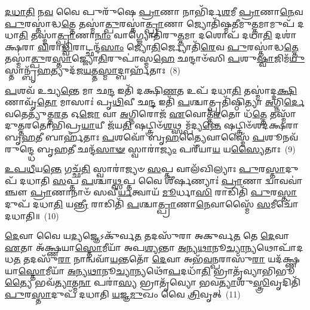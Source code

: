 \-\ul{𑌦}\-\-\ul{𑌧𑌾}\-\-\ul{𑌤𑌿} 𑌨\-\ul{𑌵} 𑌵𑍈 𑌪𑍁𑌰𑍁᳴𑌷𑍇 \ul{𑌪𑍍𑌰𑌾}\-𑌣𑌾 𑌨𑌾𑌭𑌿᳴𑌰𑍍𑌦\-\ul{𑌶}\-𑌮𑍀 \ul{𑌪𑍍𑌰𑌾}\-𑌣𑌾\-\ul{𑌨𑍇}\-𑌵 \ul{𑌪𑍁}\-𑌰𑌸𑍍𑌤𑌾॑𑌦𑍍𑌧\-\ul{𑌤𑍍𑌤𑍇} 𑌤𑌸𑍍𑌮𑌾॑\-\ul{𑌤𑍍𑌪𑍁}\-𑌰𑌸𑍍𑌤𑌾॑\-\ul{𑌤𑍍𑌪𑍍𑌰𑌾}\-𑌣𑌾 𑌜𑍍𑌯𑍋𑌤𑌿᳴𑌷𑍍𑌮𑌤𑍀𑌮𑍁\-\ul{𑌤𑍍𑌤}\-𑌮𑌾𑌮𑍁𑌪᳴ 𑌦𑌧𑌾\-\ul{𑌤𑌿} 𑌤𑌸𑍍𑌮𑌾॑\-\ul{𑌤𑍍𑌪𑍍𑌰𑌾}\-𑌣𑌾\-\ul{𑌨𑌾𑌂} 𑌵𑌾𑌗𑍍𑌜𑍍𑌯𑍋𑌤𑌿᳴𑌰𑍁\-\ul{𑌤𑍍𑌤}\-𑌮𑌾 𑌦𑌶𑍋𑌪᳴ 𑌦𑌧𑌾\-\ul{𑌤𑌿} 𑌦𑌶𑌾॑𑌕𑍍𑌷𑌰𑌾 \ul{𑌵𑌿}\-𑌰𑌾\-\ul{𑌡𑍍𑌵𑌿}\-𑌰𑌾𑌟𑍍𑌛𑌨𑍍𑌦᳴\-\ul{𑌸𑌾𑌂} 𑌜𑍍𑌯𑍋\-\ul{𑌤𑌿}\-𑌰𑍍𑌜𑍍𑌯𑍋𑌤𑌿᳴\-\ul{𑌰𑍇}\-𑌵 \ul{𑌪𑍁}\-𑌰𑌸𑍍𑌤𑌾॑𑌦𑍍𑌧\-\ul{𑌤𑍍𑌤𑍇} 𑌤𑌸𑍍𑌮𑌾॑\-\ul{𑌤𑍍𑌪𑍁}\-𑌰\-\ul{𑌸𑍍𑌤𑌾}\-𑌜𑍍𑌜𑍍𑌯𑍋\-\ul{𑌤𑌿}\-𑌰𑍁𑌪𑌾॑𑌸𑍍𑌮\-\ul{𑌹𑍇} 𑌛𑌨𑍍𑌦𑌾𑍞᳴𑌸𑌿 \ul{𑌪}\-𑌶𑍁\-\ul{𑌷𑍍𑌵𑌾}\-𑌜𑌿𑌮᳴\-\ul{𑌯𑍁}\-𑌸𑍍𑌤𑌾𑌨𑍍𑌬𑍃᳴\-\ul{𑌹}\-𑌤𑍍𑌯𑍁𑌦᳴𑌜\-\ul{𑌯}\-𑌤𑍍𑌤\-\ul{𑌸𑍍𑌮𑌾}\-𑌦𑍍𑌬𑌾𑌰𑍍\mbox{}𑌹᳴𑌤𑌾𑌃~(8)

\-\ul{𑌪}\-𑌶𑌵᳴ 𑌉𑌚𑍍𑌯\-\ul{𑌨𑍍𑌤𑍇} 𑌮𑌾 𑌛\-\ul{𑌨𑍍𑌦} 𑌇𑌤𑌿᳴ 𑌦𑌕𑍍𑌷𑌿\-\ul{𑌣}\-𑌤 𑌉𑌪᳴ 𑌦𑌧𑌾\-\ul{𑌤𑌿} 𑌤𑌸𑍍𑌮𑌾॑𑌦𑍍𑌦\-\ul{𑌕𑍍𑌷𑌿}\-𑌣𑌾𑌵𑍃᳴\-\ul{𑌤𑍋} 𑌮𑌾𑌸𑌾𑌃॑ 𑌪𑍃\-\ul{𑌥𑌿}\-𑌵𑍀 𑌛\-\ul{𑌨𑍍𑌦} 𑌇𑌤𑌿᳴ \ul{𑌪}\-𑌶𑍍𑌚𑌾𑌤𑍍𑌪𑍍𑌰𑌤𑌿᳴𑌷𑍍𑌠𑌿𑌤𑍍𑌯𑌾 \ul{𑌅}\-𑌗𑍍𑌨𑌿\-\ul{𑌰𑍍𑌦𑍇}\-𑌵𑌤𑍇𑌤𑍍𑌯𑍁᳴𑌤𑍍𑌤\-\ul{𑌰}\-𑌤 𑌓\-\ul{𑌜𑍋} 𑌵𑌾 \ul{𑌅}\-𑌗𑍍𑌨𑌿𑌰𑍋𑌜᳴ \ul{𑌏}\-𑌵𑍋𑌤𑍍𑌤᳴\-\ul{𑌰}\-𑌤𑍋 𑌧᳴\-\ul{𑌤𑍍𑌤𑍇} 𑌤𑌸𑍍𑌮𑌾᳴𑌦𑍁𑌤𑍍𑌤𑌰𑌤𑍋𑌭𑌿𑌪𑍍𑌰\-\ul{𑌯𑌾}\-𑌯𑍀 𑌜᳴𑌯\-\ul{𑌤𑌿} 𑌷𑌟𑍍𑌤𑍍𑌰𑌿𑍞᳴\-\ul{𑌶}\-𑌥𑍍𑌸𑌮𑍍𑌪᳴𑌦𑍍𑌯\-\ul{𑌨𑍍𑌤𑍇} 𑌷𑌟𑍍𑌤𑍍𑌰𑌿𑍞᳴𑌶𑌦𑌕𑍍𑌷𑌰𑌾 𑌬𑍃\-\ul{𑌹}\-𑌤𑍀 𑌬𑌾𑌰𑍍\mbox{}𑌹᳴𑌤𑌾𑌃 \ul{𑌪}\-𑌶𑌵𑍋᳴ 𑌬𑍃\-\ul{𑌹}\-𑌤𑍍𑌯𑍈𑌵𑌾𑌸𑍍𑌮𑍈᳴ \ul{𑌪}\-𑌶𑍂𑌨𑌵᳴ 𑌰𑍁𑌨𑍍𑌦𑍍𑌧𑍇 𑌬𑍃\-\ul{𑌹}\-𑌤𑍀 𑌛𑌨𑍍𑌦᳴\-\ul{𑌸𑌾}\-\-\ul{𑍟} 𑌸𑍍𑌵𑌾𑌰𑌾॑\-\ul{𑌜𑍍𑌯𑌂} 𑌪𑌰𑍀᳴𑌯𑌾\-\ul{𑌯} 𑌯\-\ul{𑌸𑍍𑌯𑍈}\-𑌤𑌾𑌃~(9)

\-\ul{𑌉}\-\-\ul{𑌪}\-\-\ul{𑌧𑍀}\-𑌯\-\ul{𑌨𑍍𑌤𑍇} 𑌗𑌚𑍍𑌛᳴\-\ul{𑌤𑌿} 𑌸𑍍𑌵𑌾𑌰𑌾॑𑌜𑍍𑌯𑍞 \ul{𑌸}\-𑌪𑍍𑌤 𑌵𑌾𑌲᳴𑌖𑌿𑌲𑍍𑌯𑌾𑌃 \ul{𑌪𑍁}\-𑌰\-\ul{𑌸𑍍𑌤𑌾}\-𑌦𑍁𑌪᳴ 𑌦𑌧𑌾𑌤𑌿 \ul{𑌸}\-𑌪𑍍𑌤 \ul{𑌪}\-𑌶𑍍𑌚𑌾\-\ul{𑌥𑍍𑌸}\-𑌪𑍍𑌤 𑌵𑍈 𑌶𑍀᳴𑌰𑍍\mbox{}\-\ul{𑌷}\-𑌣𑍍𑌯𑌾𑌃॑ \ul{𑌪𑍍𑌰𑌾}\-𑌣𑌾 𑌦𑍍𑌵𑌾𑌵𑌵𑌾॑𑌞𑍍𑌚𑍗 \ul{𑌪𑍍𑌰𑌾}\-𑌣𑌾𑌨𑌾𑍞᳴ 𑌸𑌵𑍀\-\ul{𑌰𑍍𑌯}\-𑌤𑍍𑌵𑌾𑌯᳴ \ul{𑌮𑍂}\-𑌰𑍍𑌧𑌾\-\ul{𑌸𑌿} 𑌰𑌾𑌡𑌿𑌤𑌿᳴ \ul{𑌪𑍁}\-𑌰\-\ul{𑌸𑍍𑌤𑌾}\-𑌦𑍁𑌪᳴ 𑌦𑌧𑌾\-\ul{𑌤𑌿} 𑌯\-\ul{𑌨𑍍𑌤𑍍𑌰𑍀} 𑌰𑌾𑌡𑌿𑌤𑌿᳴ \ul{𑌪}\-𑌶𑍍𑌚𑌾\-\ul{𑌤𑍍𑌪𑍍𑌰𑌾}\-𑌣𑌾\-\ul{𑌨𑍇}\-𑌵𑌾𑌸𑍍𑌮𑍈᳴ \ul{𑌸}\-𑌮𑍀𑌚𑍋᳴ 𑌦𑌧𑌾𑌤𑌿॥~(10)

{}%

\-\ul{𑌦𑍇}\-𑌵𑌾 𑌵𑍈 𑌯\-\ul{𑌦𑍍𑌯}\-𑌜𑍍𑌞𑍇\-𑌽𑌕𑍁᳴𑌰𑍍𑌵\-\ul{𑌤} 𑌤𑌦𑌸𑍁᳴𑌰𑌾 𑌅𑌕𑍁𑌰𑍍𑌵\-\ul{𑌤} 𑌤𑍇 \ul{𑌦𑍇}\-𑌵𑌾 \ul{𑌏}\-𑌤𑌾 𑌅᳴𑌕𑍍𑌷𑍍𑌣𑌯𑌾\-\ul{𑌸𑍍𑌤𑍋}\-𑌮𑍀𑌯𑌾᳴ 𑌅𑌪\-\ul{𑌶𑍍𑌯}\-𑌨𑍍𑌤𑌾 \ul{𑌅}\-𑌨𑍍𑌯\-\ul{𑌥𑌾}\-𑌨𑍂\-\ul{𑌚𑍍𑌯𑌾}\-𑌨𑍍𑌯𑌥𑍋𑌪𑌾᳴𑌦𑌧\-\ul{𑌤} 𑌤𑌦𑌸𑍁᳴\-\ul{𑌰𑌾} 𑌨𑌾𑌨𑍍𑌵𑌵𑌾᳴\-\ul{𑌯}\-𑌨𑍍𑌤𑌤𑍋᳴ \ul{𑌦𑍇}\-𑌵𑌾 𑌅𑌭᳴\-\ul{𑌵}\-𑌨𑍍𑌪𑌰𑌾𑌸𑍁᳴\-\ul{𑌰𑌾} 𑌯𑌦᳴𑌕𑍍𑌷𑍍𑌣𑌯𑌾\-\ul{𑌸𑍍𑌤𑍋}\-𑌮𑍀𑌯𑌾᳴ \ul{𑌅}\-𑌨𑍍𑌯\-\ul{𑌥𑌾}\-𑌨𑍂\-\ul{𑌚𑍍𑌯𑌾}\-𑌨𑍍𑌯𑌥𑍋᳴\-\ul{𑌪}\-𑌦𑌧𑌾᳴\-\ul{𑌤𑌿} 𑌭𑍍𑌰𑌾𑌤𑍃᳴𑌵𑍍𑌯𑌾𑌭𑌿𑌭𑍂\-\ul{𑌤𑍍𑌯𑍈} 𑌭𑌵᳴\-\ul{𑌤𑍍𑌯𑌾}\-𑌤𑍍𑌮\-\ul{𑌨𑌾} 𑌪𑌰𑌾॑\-\ul{𑌸𑍍𑌯} 𑌭𑍍𑌰𑌾𑌤𑍃᳴𑌵𑍍𑌯𑍋 𑌭𑌵\-\ul{𑌤𑍍𑌯𑌾}\-𑌶𑍁\-\ul{𑌸𑍍𑌤𑍍𑌰𑌿}\-𑌵𑍃𑌦𑌿𑌤𑌿᳴ \ul{𑌪𑍁}\-𑌰\-\ul{𑌸𑍍𑌤𑌾}\-𑌦𑍁𑌪᳴ 𑌦𑌧𑌾𑌤𑌿 \ul{𑌯}\-𑌜𑍍𑌞\-\ul{𑌮𑍁}\-𑌖𑌂 𑌵𑍈 \ul{𑌤𑍍𑌰𑌿}\-𑌵𑍃𑌤𑍍~(11)

